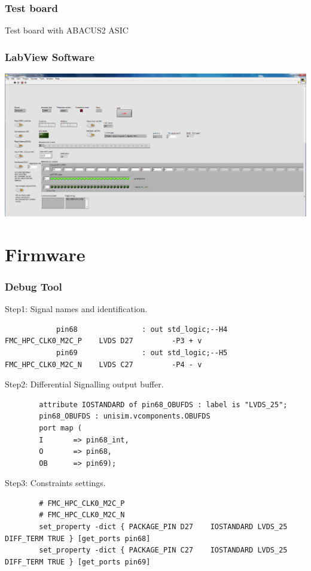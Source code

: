 \documentclass[aspectratio=169]{beamer}
\begin{document}
	\begin{frame}
	\frametitle{Test board}
	\begin{center}
		Test board with ABACUS2 ASIC
	\end{center}
	\end{frame}

	\begin{frame}
	\frametitle{LabView Software}
	\begin{center}
		\includegraphics[width=0.8 \textwidth]{IMG/LabVIEWBaselineDac.PNG}
	\end{center}
	
	\end{frame}

	
	\section{Firmware}
	
	\begin{frame}[fragile]
	\frametitle{Debug Tool}
	\begin{center}
		{\small \color{blue} Step1: Signal names and identification.}
	\end{center}
	{\tiny
		\begin{verbatim}
			pin68				: out std_logic;--H4  FMC_HPC_CLK0_M2C_P    LVDS D27         -P3 + v
			pin69				: out std_logic;--H5  FMC_HPC_CLK0_M2C_N    LVDS C27         -P4 - v 
		\end{verbatim} }
	\begin{center}
		{\small \color{blue} Step2: Differential Signalling output buffer.}
	\end{center}
	{\tiny
		\begin{verbatim}
		attribute IOSTANDARD of pin68_OBUFDS : label is "LVDS_25";	
		pin68_OBUFDS : unisim.vcomponents.OBUFDS
		port map (
		I		=> pin68_int,
		O		=> pin68,
		OB		=> pin69);		
		\end{verbatim} }
	\begin{center}
		{\small \color{blue} Step3: Constraints settings.}
	\end{center}
	{\tiny
		\begin{verbatim}
		# FMC_HPC_CLK0_M2C_P
		# FMC_HPC_CLK0_M2C_N
		set_property -dict { PACKAGE_PIN D27	IOSTANDARD LVDS_25 DIFF_TERM TRUE }	[get_ports pin68]
		set_property -dict { PACKAGE_PIN C27	IOSTANDARD LVDS_25 DIFF_TERM TRUE }	[get_ports pin69]
		\end{verbatim} }
	\end{frame}
\end{document}
